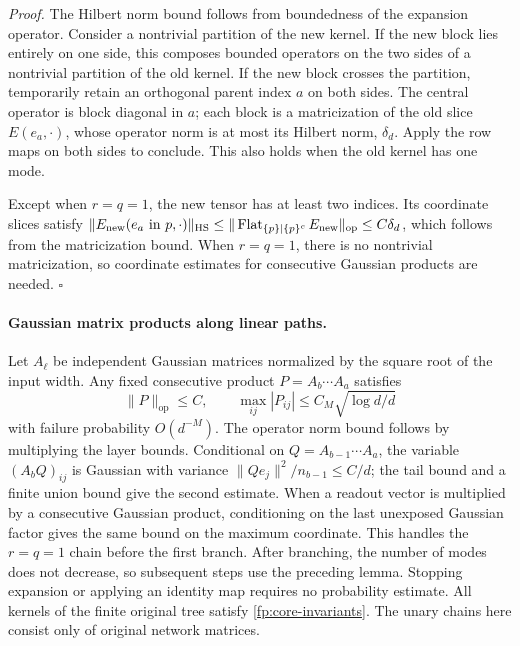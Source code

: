 \documentclass[a4paper]{tufte-handout}
\begin{document}
\begin{fullwidth}
\emph{Proof.}
The Hilbert norm bound follows from boundedness of the expansion operator. Consider a nontrivial partition of the new kernel.
If the new block lies entirely on one side, this composes bounded operators on the two sides of a nontrivial partition of the old kernel.
If the new block crosses the partition, temporarily retain an orthogonal parent index $a$ on both sides. The central operator is block diagonal in $a$;
each block is a matricization of the old slice $E(e_a,\cdot)$, whose operator norm is at most its Hilbert norm,
$\delta_d$. Apply the row maps on both sides to conclude. This also holds when the old kernel has one mode.

Except when $r=q=1$, the new tensor has at least two indices. Its coordinate slices satisfy
$\|E_{\rm new}(e_a\text{ in }p,\cdot)\|_{\rm HS}
\le\|\operatorname{Flat}_{\{p\}|\{p\}^c}E_{\rm new}\|_{\rm op}\le C\delta_d$,
which follows from the matricization bound. When $r=q=1$, there is no nontrivial matricization, so coordinate estimates for consecutive Gaussian products are needed.
\hfill$\square$

\paragraph{Gaussian matrix products along linear paths.}
Let $A_\ell$ be independent Gaussian matrices normalized by the square root of the input width.
Any fixed consecutive product $P=A_b\cdots A_a$ satisfies
\begin{equation}
 \|P\|_{\mathrm{op}}\leq C,\qquad
 \max_{ij}|P_{ij}|\leq C_M\sqrt{\log d/d}
 \label{fp:core-product-event}
\end{equation}
with failure probability $O(d^{-M})$. The operator norm bound follows by multiplying the layer bounds. Conditional on
$Q=A_{b-1}\cdots A_a$, the variable $(A_bQ)_{ij}$ is Gaussian with variance
$\|Qe_j\|^2/n_{b-1}\leq C/d$; the tail bound and a finite union bound give the second estimate.
When a readout vector is multiplied by a consecutive Gaussian product, conditioning on the last unexposed Gaussian factor gives the same bound on the maximum coordinate.
This handles the $r=q=1$ chain before the first branch. After branching, the number of modes does not decrease, so subsequent steps use the preceding lemma.
Stopping expansion or applying an identity map requires no probability estimate. All kernels of the finite original tree satisfy
\eqref{fp:core-invariants}. The unary chains here consist only of original network matrices.


\end{fullwidth}
\end{document}
